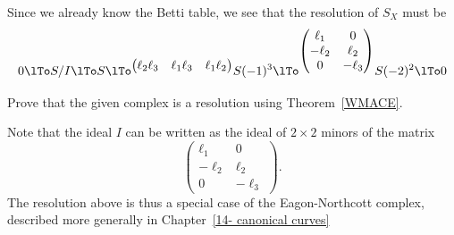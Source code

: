\begin{example}
 Since we already know the Betti table, we see that the resolution
 of $S_{X}$ must be
$$
0\lTo S/I\lTo S
\lTo^{\begin{pmatrix}
\ell_2\ell_3&\ell_1\ell_3&\ell_1\ell_2
\end{pmatrix}}
 S(-1)^3
 \lTo^{\begin{pmatrix}
  \ell_1&0\\
  -\ell_2&\ell_2\\
 0&-\ell_3
 \end{pmatrix}}
 S(-2)^2
 \lTo 0
$$
\begin{exercise}
Prove that the given complex is a resolution using Theorem~\ref{WMACE}.
\end{exercise}
 
Note that the
ideal $I$ can be written as the ideal of $2\times 2$ minors of the matrix
$$
 {\begin{pmatrix}
  \ell_1&0\\
  -\ell_2&\ell_2\\
 0&-\ell_3
 \end{pmatrix}}.
$$
The resolution above is thus a special case of the Eagon-Northcott complex, described more generally in Chapter~\ref{14- canonical curves}
\end{example}

